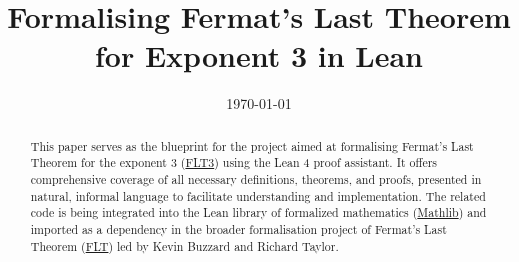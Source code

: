 \documentclass[11pt,a4paper]{report}
\title{Formalising Fermat's Last Theorem for Exponent 3 in Lean}
\date{\today}
\begin{document}
\maketitle
\begin{abstract}
    This paper serves as the blueprint for the project aimed at formalising Fermat’s Last Theorem
    for the exponent 3 (\href{https://github.com/pitmonticone/FLT3}{FLT3}) using the Lean 4 proof assistant.
    It offers comprehensive coverage of all necessary definitions, theorems, and proofs, presented in natural,
    informal language to facilitate understanding and implementation. The related code is being integrated
    into the Lean library of formalized mathematics (\href{https://github.com/leanprover-community/mathlib4}{Mathlib})
    and imported as a dependency in the broader formalisation project of Fermat's Last Theorem
    (\href{https://github.com/ImperialCollegeLondon/FLT}{FLT}) led by Kevin Buzzard and Richard Taylor.
\end{abstract}
\tableofcontents



\nocite{*}
\printbibliography[title=References]
\end{document}
